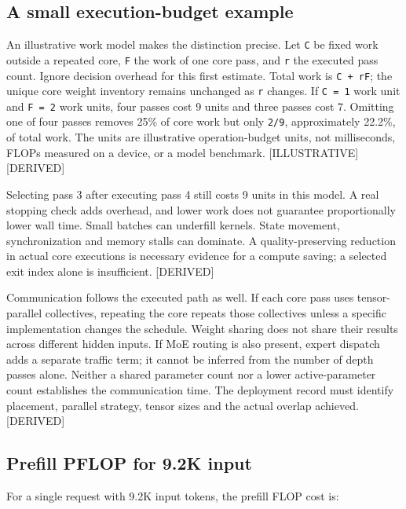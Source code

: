 \subsection{A small execution-budget
example}\label{a-small-execution-budget-example}

An illustrative work model makes the distinction precise. Let \texttt{C}
be fixed work outside a repeated core, \texttt{F} the work of one core
pass, and \texttt{r} the executed pass count. Ignore decision overhead
for this first estimate. Total work is \texttt{C\ +\ rF}; the unique
core weight inventory remains unchanged as \texttt{r} changes. If
\texttt{C\ =\ 1} work unit and \texttt{F\ =\ 2} work units, four passes
cost 9 units and three passes cost 7. Omitting one of four passes
removes 25\% of core work but only \texttt{2/9}, approximately 22.2\%,
of total work. The units are illustrative operation-budget units, not
milliseconds, FLOPs measured on a device, or a model benchmark.
\mbox{{[}ILLUSTRATIVE{]}}\hspace{0pt}\mbox{{[}DERIVED{]}}

Selecting pass 3 after executing pass 4 still costs 9 units in this
model. A real stopping check adds overhead, and lower work does not
guarantee proportionally lower wall time. Small batches can underfill
kernels. State movement, synchronization and memory stalls can dominate.
A quality-preserving reduction in actual core executions is necessary
evidence for a compute saving; a selected exit index alone is
insufficient. \mbox{{[}DERIVED{]}}

Communication follows the executed path as well. If each core pass uses
tensor-parallel collectives, repeating the core repeats those
collectives unless a specific implementation changes the schedule.
Weight sharing does not share their results across different hidden
inputs. If MoE routing is also present, expert dispatch adds a separate
traffic term; it cannot be inferred from the number of depth passes
alone. Neither a shared parameter count nor a lower active-parameter
count establishes the communication time. The deployment record must
identify placement, parallel strategy, tensor sizes and the actual
overlap achieved. \mbox{{[}DERIVED{]}}

\subsection{Prefill PFLOP for 9.2K
input}\label{prefill-pflop-for-9.2k-input}

For a single request with 9.2K input tokens, the prefill FLOP cost is:

